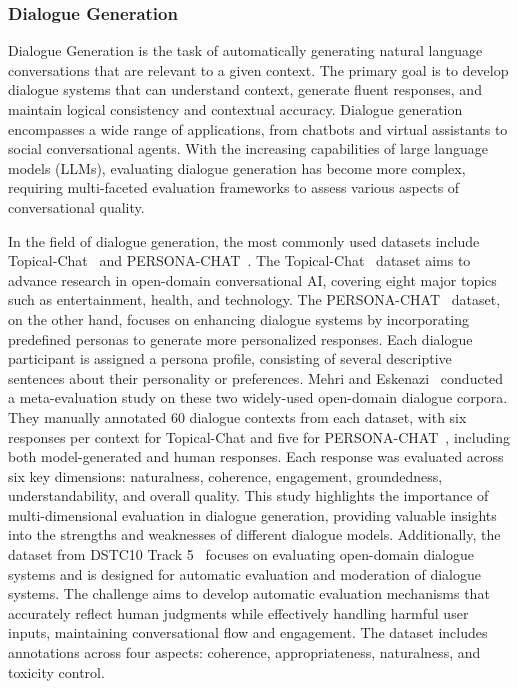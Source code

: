 \subsubsection{Dialogue Generation}
\label{sec:Dialogue Generation}
Dialogue Generation is the task of automatically generating natural language conversations that are relevant to a given context. The primary goal is to develop dialogue systems that can understand context, generate fluent responses, and maintain logical consistency and contextual accuracy. Dialogue generation encompasses a wide range of applications, from chatbots and virtual assistants to social conversational agents. With the increasing capabilities of large language models (LLMs), evaluating dialogue generation has become more complex, requiring multi-faceted evaluation frameworks to assess various aspects of conversational quality.

In the field of dialogue generation, the most commonly used datasets include Topical-Chat~\cite{gopalakrishnan2023topical} and PERSONA-CHAT~\cite{zhang2018personalizing}. The Topical-Chat~\cite{gopalakrishnan2023topical} dataset aims to advance research in open-domain conversational AI, covering eight major topics such as entertainment, health, and technology. The PERSONA-CHAT~\cite{zhang2018personalizing} dataset, on the other hand, focuses on enhancing dialogue systems by incorporating predefined personas to generate more personalized responses. Each dialogue participant is assigned a persona profile, consisting of several descriptive sentences about their personality or preferences.
Mehri and Eskenazi~\cite{mehri2020usr} conducted a meta-evaluation study on these two widely-used open-domain dialogue corpora. They manually annotated 60 dialogue contexts from each dataset, with six responses per context for Topical-Chat and five for PERSONA-CHAT~\cite{zhang2018personalizing}, including both model-generated and human responses. Each response was evaluated across six key dimensions: naturalness, coherence, engagement, groundedness, understandability, and overall quality. This study highlights the importance of multi-dimensional evaluation in dialogue generation, providing valuable insights into the strengths and weaknesses of different dialogue models.
Additionally, the dataset from DSTC10 Track 5~\cite{yoshino2023overview,zhang2021automatic} focuses on evaluating open-domain dialogue systems and is designed for automatic evaluation and moderation of dialogue systems. The challenge aims to develop automatic evaluation mechanisms that accurately reflect human judgments while effectively handling harmful user inputs, maintaining conversational flow and engagement. The dataset includes annotations across four aspects: coherence, appropriateness, naturalness, and toxicity control.



